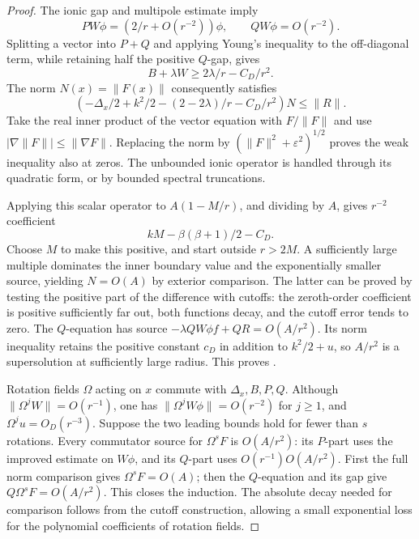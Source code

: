 \begin{proof}
The ionic gap and multipole estimate imply
\[
 PW\phi=(2/r+O(r^{-2}))\phi,\qquad QW\phi=O(r^{-2}).
 \]
Splitting a vector into \(P+Q\) and applying Young's inequality to
the off-diagonal term, while retaining half the positive \(Q\)-gap,
gives
\begin{equation}
 B+\lambda W\geq 2\lambda/r-C_D/r^2.
 \label{eq:ionic-schur-bound}
\end{equation}
The norm \(N(x)=\|F(x)\|\) consequently satisfies
\[
 \left(-\Delta_x/2+k^2/2-(2-2\lambda)/r-C_D/r^2\right)N\leq\|R\|.
 \]
Take the real inner product of the vector equation with \(F/\|F\|\)
and use \(|\nabla\|F\||\leq\|\nabla F\|\).  Replacing the norm by
\((\|F\|^2+\varepsilon^2)^{1/2}\) proves the weak inequality also
at zeros.  The unbounded ionic operator is handled through its
quadratic form, or by bounded spectral truncations.

Applying this scalar operator to \(A(1-M/r)\), and dividing by \(A\),
gives \(r^{-2}\) coefficient
\[
 kM-\beta(\beta+1)/2-C_D.
 \]
Choose \(M\) to make this positive, and start outside \(r>2M\).
A sufficiently large multiple dominates the inner boundary value
and the exponentially smaller source, yielding \(N=O(A)\) by
exterior comparison.  The latter can be proved by testing the
positive part of the difference with cutoffs: the zeroth-order
coefficient is positive sufficiently far out, both functions
decay, and the cutoff error tends to zero.
The \(Q\)-equation has source
\(-\lambda QW\phi f+QR=O(A/r^2)\).  Its norm inequality retains
the positive constant \(c_D\) in addition to \(k^2/2+u\), so
\(A/r^2\) is a supersolution at sufficiently large radius.  This
proves .

Rotation fields \(\Omega\) acting on \(x\) commute with
\(\Delta_x,B,P,Q\).  Although \(\|\Omega^jW\|=O(r^{-1})\),
one has \(\|\Omega^jW\phi\|=O(r^{-2})\) for \(j\geq1\), and
\(\Omega^ju=O_D(r^{-3})\).
Suppose the two leading bounds hold for fewer than \(s\) rotations.
Every commutator source for \(\Omega^sF\) is \(O(A/r^2)\):
its \(P\)-part uses the improved estimate on \(W\phi\), and its
\(Q\)-part uses \(O(r^{-1})O(A/r^2)\).
First the full norm comparison gives \(\Omega^sF=O(A)\);
then the \(Q\)-equation and its gap give \(Q\Omega^sF=O(A/r^2)\).
This closes the induction.  The absolute decay needed for
comparison follows from the cutoff construction, allowing a small
exponential loss for the polynomial coefficients of rotation fields.


\end{proof}
